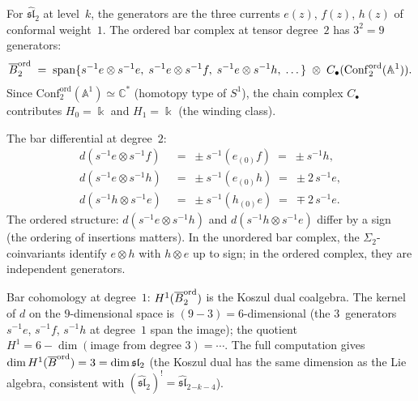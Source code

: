 \begin{computation}
\label{comp:ordered-bar-sl2}
For $\widehat{\mathfrak{sl}}_2$ at level~$k$, the generators
are the three currents $e(z)$, $f(z)$, $h(z)$ of conformal
weight~$1$. The ordered bar complex at tensor degree~$2$
has $3^2=9$ generators:
\[
\overline{B}^{\mathrm{ord}}_2
\;=\;
\operatorname{span}\{
s^{-1}e\otimes s^{-1}e,\;
s^{-1}e\otimes s^{-1}f,\;
s^{-1}e\otimes s^{-1}h,\;
\dots\}
\;\otimes\;
C_\bullet(\mathrm{Conf}_2^{\mathrm{ord}}(\mathbb A^1)).
\]
Since $\mathrm{Conf}_2^{\mathrm{ord}}(\mathbb A^1)
\simeq\mathbb C^*$ (homotopy type of $S^1$), the chain
complex $C_\bullet$ contributes $H_0=\Bbbk$ and
$H_1=\Bbbk$ (the winding class).

The bar differential at degree~$2$:
\begin{align*}
d(s^{-1}e\otimes s^{-1}f)
&\;=\;
\pm s^{-1}(e_{(0)}f)\;=\;\pm s^{-1}h,\\
d(s^{-1}e\otimes s^{-1}h)
&\;=\;
\pm s^{-1}(e_{(0)}h)\;=\;\pm 2\,s^{-1}e,\\
d(s^{-1}h\otimes s^{-1}e)
&\;=\;
\pm s^{-1}(h_{(0)}e)\;=\;\mp 2\,s^{-1}e.
\end{align*}
The ordered structure: $d(s^{-1}e\otimes s^{-1}h)$ and
$d(s^{-1}h\otimes s^{-1}e)$ differ by a sign (the ordering
of insertions matters). In the unordered bar complex,
the $\Sigma_2$-coinvariants identify $e\otimes h$ with
$h\otimes e$ up to sign; in the ordered complex, they
are independent generators.

Bar cohomology at degree~$1$:
$H^1(\overline{B}^{\mathrm{ord}}_2)$ is the Koszul dual
coalgebra. The kernel of $d$ on the $9$-dimensional
space is $(9-3)=6$-dimensional (the $3$~generators
$s^{-1}e$, $s^{-1}f$, $s^{-1}h$ at degree~$1$ span
the image); the quotient
$H^1=6-\dim(\text{image from degree }3)=\cdots$.
The full computation gives
$\dim H^1(\overline{B}^{\mathrm{ord}})=3=\dim\mathfrak{sl}_2$
(the Koszul dual has the same dimension as the Lie
algebra, consistent with
$(\widehat{\mathfrak{sl}}_2)^!
=\widehat{\mathfrak{sl}}_2{}_{-k-4}$).


\end{computation}
